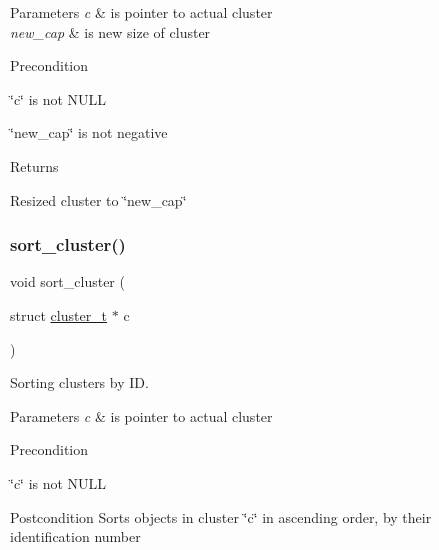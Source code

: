 \begin{DoxyParams}{Parameters}
{\em c} & is pointer to actual cluster\\
\hline
{\em new\+\_\+cap} & is new size of cluster\\
\hline
\end{DoxyParams}
\begin{DoxyPrecond}{Precondition}

\begin{DoxyItemize}
\item \char`\"{}c\char`\"{} is not N\+U\+LL
\item \char`\"{}new\+\_\+cap\char`\"{} is not negative
\end{DoxyItemize}
\end{DoxyPrecond}
\begin{DoxyReturn}{Returns}

\begin{DoxyItemize}
\item Resized cluster to \char`\"{}new\+\_\+cap\char`\"{} 
\end{DoxyItemize}
\end{DoxyReturn}
\mbox{\label{group___cluster_operations_ga12718af9e3e31b61bf703ec260e22450}} 
\subsubsection{\texorpdfstring{sort\+\_\+cluster()}{sort\_cluster()}}
{\footnotesize\ttfamily void sort\+\_\+cluster (\begin{DoxyParamCaption}\item[{struct \mbox{\hyperlink{structcluster__t}{cluster\+\_\+t}} $\ast$}]{c }\end{DoxyParamCaption})}



Sorting clusters by ID. 


\begin{DoxyParams}{Parameters}
{\em c} & is pointer to actual cluster\\
\hline
\end{DoxyParams}
\begin{DoxyPrecond}{Precondition}

\begin{DoxyItemize}
\item \char`\"{}c\char`\"{} is not N\+U\+LL
\end{DoxyItemize}
\end{DoxyPrecond}
\begin{DoxyPostcond}{Postcondition}
Sorts objects in cluster \char`\"{}c\char`\"{} in ascending order, by their identification number 
\end{DoxyPostcond}
